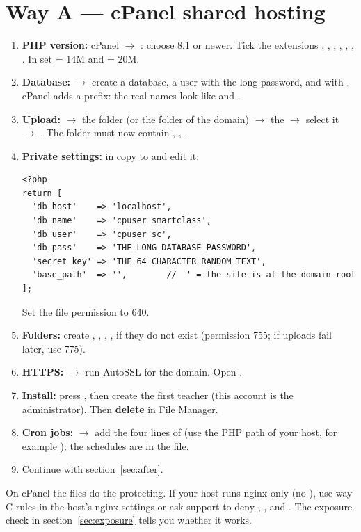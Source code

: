\documentclass[11pt,a4paper]{article}
\begin{document}
\section{Way A --- cPanel shared hosting}
\begin{enumerate}
\item \textbf{PHP version:} cPanel $\rightarrow$ : choose 8.1 or newer. Tick the extensions , , , , , , . In  set  = 14M and  = 20M.
\item \textbf{Database:}  $\rightarrow$ create a database, a user with the long password, and  with . cPanel adds a prefix: the real names look like  and .
\item \textbf{Upload:}  $\rightarrow$ the folder  (or the folder of the domain) $\rightarrow$  the  $\rightarrow$ select it $\rightarrow$ . The folder must now contain , , .
\item \textbf{Private settings:} in  copy  to  and edit it:
\begin{lstlisting}
<?php
return [
  'db_host'    => 'localhost',
  'db_name'    => 'cpuser_smartclass',
  'db_user'    => 'cpuser_sc',
  'db_pass'    => 'THE_LONG_DATABASE_PASSWORD',
  'secret_key' => 'THE_64_CHARACTER_RANDOM_TEXT',
  'base_path'  => '',        // '' = the site is at the domain root
];
\end{lstlisting}
Set the file permission to 640.
\item \textbf{Folders:} create , , , ,  if they do not exist (permission 755; if uploads fail later, use 775).
\item \textbf{HTTPS:}  $\rightarrow$ run AutoSSL for the domain. Open .
\item \textbf{Install:} press , then create the first teacher (this account is the administrator). Then \textbf{delete } in File Manager.
\item \textbf{Cron jobs:}  $\rightarrow$ add the four lines of  (use the PHP path of your host, for example ); the schedules are in the file.
\item Continue with section~\ref{sec:after}.
\end{enumerate}
\begin{caution}On cPanel the  files do the protecting. If your host runs nginx only (no ), use way C rules in the host's nginx settings or ask support to deny , ,  and . The exposure check in section~\ref{sec:exposure} tells you whether it works.\end{caution}
\end{document}
